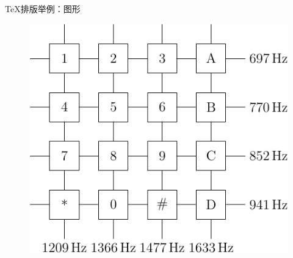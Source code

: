 \documentclass[xcolor=table,dvipsnames,svgnames]{beamer}
\begin{document}
\begin{frame}{\TeX{}排版举例：图形}
\begin{minipage}[t]{0.5\linewidth}
\begin{figure}[h]
  \centering
  \includegraphics[height=.33\textheight]{dtmf.pdf}
\end{figure}
\end{minipage}
\end{frame}
\end{document}
